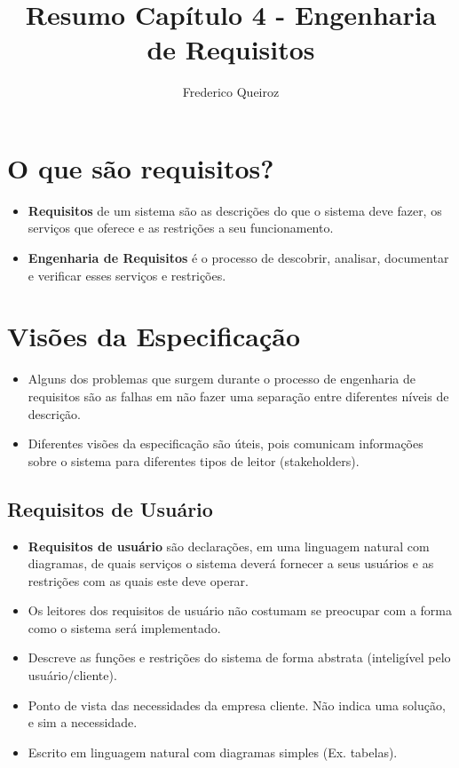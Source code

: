 \documentclass[a4paper, 11pt]{article}
\author{Frederico Queiroz}
\title{Resumo Capítulo 4 - Engenharia de Requisitos}
\begin{document}
\maketitle

\section{O que são requisitos?}
\begin{itemize}
    \item \textbf{Requisitos} de um sistema são as descrições do que o sistema deve fazer, os serviços que oferece e as restrições a seu funcionamento.
    \item \textbf{Engenharia de Requisitos} é o processo de descobrir, analisar, documentar e verificar esses serviços e restrições. 
\end{itemize}

\section{Visões da Especificação}
\begin{itemize}
    \item Alguns dos problemas que surgem durante o processo de engenharia de requisitos são as falhas em não fazer uma separação entre diferentes níveis de descrição.
    \item Diferentes visões da especificação são úteis, pois comunicam informações sobre o sistema para diferentes tipos de leitor (stakeholders).
\end{itemize}

\subsection{Requisitos de Usuário}
\begin{itemize}
    \item \textbf{Requisitos de usuário} são declarações, em uma linguagem natural com diagramas, de quais serviços o sistema deverá fornecer a seus usuários
    e as restrições com as quais este deve operar.
    \item Os leitores dos requisitos de usuário não costumam se preocupar com a forma como o sistema será implementado.
    \item Descreve as funções e restrições do sistema de forma abstrata (inteligível pelo usuário/cliente).
    \item Ponto de vista das necessidades da empresa cliente. Não indica uma solução, e sim a necessidade.
    \item Escrito em linguagem natural com diagramas simples (Ex. tabelas).
\end{itemize}
\end{document}
